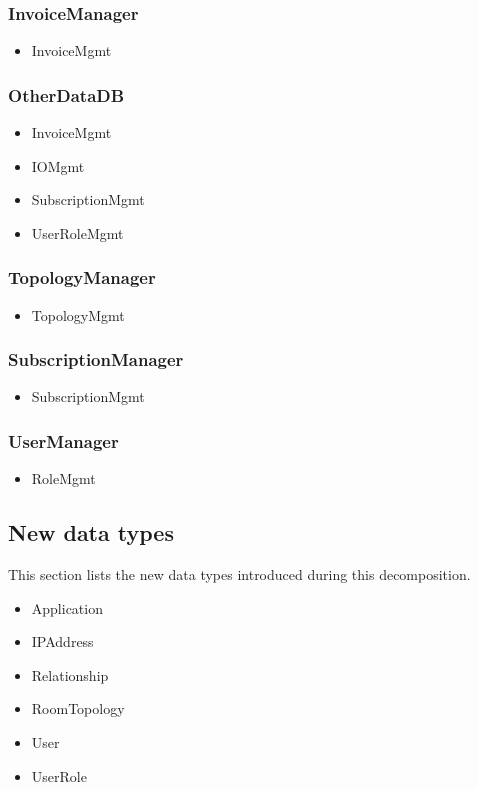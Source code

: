     \subsubsection{InvoiceManager}
        \begin{itemize}
            \item InvoiceMgmt
        \end{itemize}

    \subsubsection{OtherDataDB}
        \begin{itemize}
            \item InvoiceMgmt
            \item IOMgmt
            \item SubscriptionMgmt
            \item UserRoleMgmt
        \end{itemize}

    \subsubsection{TopologyManager}
        \begin{itemize}
            \item TopologyMgmt
        \end{itemize}

    \subsubsection{SubscriptionManager}
        \begin{itemize}
            \item SubscriptionMgmt
        \end{itemize}

    \subsubsection{UserManager}
        \begin{itemize}
            \item RoleMgmt
        \end{itemize}


\subsection{New data types}
    This section lists the new data types introduced during this decomposition.

    \begin{itemize}
        \item Application
        \item IPAddress
        \item Relationship
        \item RoomTopology
        \item User
        \item UserRole
    \end{itemize}

